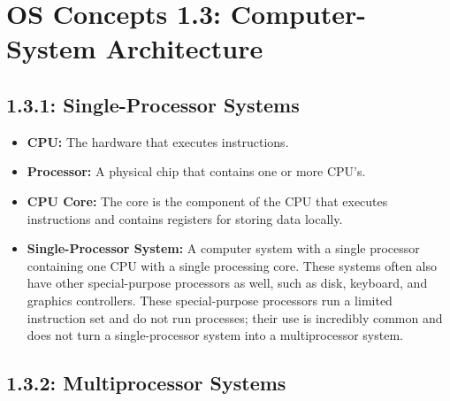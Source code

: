 \documentclass[12pt]{article}
\begin{document}
\section*{OS Concepts 1.3: Computer-System Architecture}

\subsection*{1.3.1: Single-Processor Systems}

\begin{itemize}
    \item \textbf{CPU:} The hardware that executes instructions.
    \item \textbf{Processor:} A physical chip that contains one or more CPU's.
    \item \textbf{CPU Core:} The core is the component of the CPU that executes instructions and contains registers for storing data locally.
    \item \textbf{Single-Processor System:} A computer system with a single processor containing one CPU with a single processing core. These systems often also have other special-purpose processors as well, such as disk, keyboard, and graphics controllers. These special-purpose processors run a limited instruction set and do not run processes; their use is incredibly common and does not turn a single-processor system into a multiprocessor system.
\end{itemize}

\subsection*{1.3.2: Multiprocessor Systems}
\end{document}
